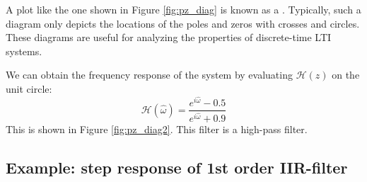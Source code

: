 A plot like the one shown in Figure \ref{fig:pz_diag} is known as a
\emph{}. Typically, such a diagram
only depicts the locations of the poles and zeros with crosses and circles.
These diagrams are useful for analyzing the properties of discrete-time LTI systems.

We can obtain the frequency response of the system by evaluating
$\mathcal{H}(z)$ on the unit circle:
\begin{equation}
    \mathcal{H}(\hat{\omega}) = \frac{e^{i\hat{\omega}}-0.5}{e^{i\hat{\omega}}+0.9}
\end{equation}
This is shown in Figure \ref{fig:pz_diag2}. This filter is a high-pass
filter.

    \subsection{Example: step response of 1st order IIR-filter}

